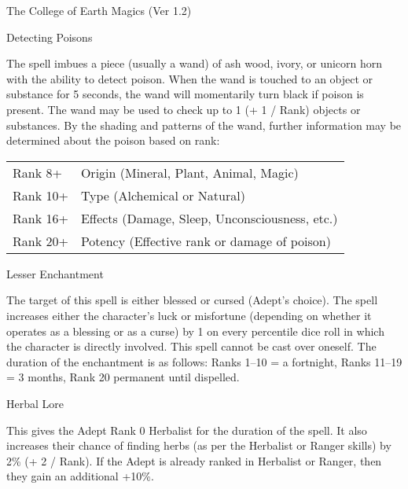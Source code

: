 \begin{Chapter}{The College of Earth Magics (Ver 1.2)}
\begin{spell}[G-8]{Detecting Poisons }

\begin{effects}
The spell imbues a piece (usually a wand) of ash wood, ivory, or
unicorn horn with the ability to detect poison.  When the wand is
touched to an object or substance for 5 seconds, the wand will
momentarily turn black if poison is present.  The wand may be used to
check up to 1 (+ 1 / Rank) objects or substances. By the shading and
patterns of the wand, further information may be determined about the
poison based on rank:

\begin{tabularx}{\linewidth}{lX}
Rank 8+ & Origin (Mineral, Plant, Animal, Magic) \\
Rank 10+ & Type (Alchemical or Natural) \\
Rank 16+ & Effects (Damage, Sleep, Unconsciousness, etc.) \\
Rank 20+ & Potency (Effective rank or damage of poison) \\
\end{tabularx}

\end{effects}
\end{spell}

\begin{spell}[G-9]{Lesser Enchantment }

\begin{effects}
The target of this spell is either blessed or cursed (Adept’s choice).
The spell increases either the character’s luck or misfortune
(depending on whether it operates as a blessing or as a curse) by 1 on
every percentile dice roll in which the character is directly
involved.  This spell cannot be cast over oneself.  The duration of
the enchantment is as follows: Ranks 1–10 = a fortnight, Ranks 11–19 =
3 months, Rank 20 permanent until dispelled.
\end{effects}
\end{spell}

\begin{spell}[G-10]{Herbal Lore }

\begin{effects}
This gives the Adept Rank 0 Herbalist for the duration of the spell.
It also increases their chance of finding herbs (as per the Herbalist
or Ranger skills) by 2\% (+ 2 / Rank). If the Adept is already ranked
in Herbalist or Ranger, then they gain an additional +10\%.
\end{effects}
\end{spell}


\end{Chapter}
